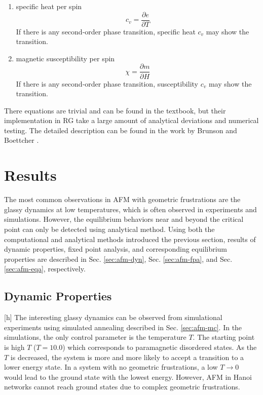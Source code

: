 \begin{enumerate}
\item specific heat per spin
\begin{equation}
c_v = \frac{\partial e} {\partial T}
\end{equation}
If there is any second-order phase transition, specific heat $c_v$ may show the transition.

\item magnetic susceptibility per spin
\begin{equation}
\chi = \frac{\partial m} {\partial H}
\end{equation}
If there is any second-order phase transition, susceptibility  $c_v$ may show the transition.

\end{enumerate}

There equations are trivial and can be found in the textbook, but their implementation in RG take a large amount of analytical deviations and numerical testing. The detailed description can be found in the work by Brunson and Boettcher \cite{brunson2014rg}.


\section{Results}
\label{sec:afm-results}
The most common observations in AFM with geometric frustrations are the glassy dynamics at low temperatures, which is often observed in experiments and simulations. However, the equilibrium behaviors near and beyond the critical point can only be detected using analytical method. Using both the computational and analytical methods introduced the previous section, results of dynamic properties, fixed point analysis, and corresponding equilibrium properties are described in Sec. \ref{sec:afm-dyn}, Sec. \ref{sec:afm-fpa}, and Sec. \ref{sec:afm-eqa}, respectively.

\subsection{Dynamic Properties}[h]
\label{sec:afm-dyn}
The interesting glassy dynamics can be observed from simulational experiments using simulated annealing described in Sec. \ref{sec:afm-mc}. In the simulations, the only control parameter is the temperature $T$. The starting point is high $T$ ($T=10.0$) which corresponds to 
 paramagnetic disordered states. As the $T$ is decreased, the system is more and more likely to
 accept a transition to a lower energy state. In a system with no geometric frustrations, a low $T\rightarrow0$ would lead to the ground state with the lowest energy. However, AFM in Hanoi networks cannot reach ground states due to complex geometric frustrations. 

